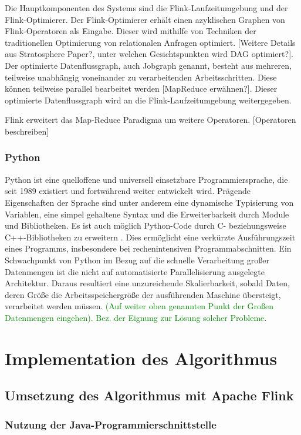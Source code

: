 Die Hauptkomponenten des Systems sind die Flink-Laufzeitumgebung und der Flink-Optimierer. Der Flink-Optimierer erhält einen azyklischen Graphen von Flink-Operatoren als Eingabe. Dieser wird mithilfe von Techniken der traditionellen Optimierung von relationalen Anfragen optimiert. [Weitere Details aus Stratosphere Paper?, unter welchen Gesichtspunkten wird DAG optimiert?]. Der optimierte Datenflussgraph, auch Jobgraph genannt, besteht aus mehreren, teilweise unabhängig voneinander zu verarbeitenden Arbeitsschritten. Diese können teilweise parallel bearbeitet werden [MapReduce erwähnen?]. Dieser optimierte Datenflussgraph wird an die Flink-Laufzeitumgebung weitergegeben. 

Flink erweitert das Map-Reduce Paradigma um weitere Operatoren. [Operatoren beschreiben]
\subsection{Python}
Python ist eine quelloffene und universell einsetzbare Programmiersprache, die seit 1989 existiert und fortwährend weiter entwickelt wird. Prägende Eigenschaften der Sprache sind unter anderem eine dynamische Typisierung von Variablen, eine simpel gehaltene Syntax und die Erweiterbarkeit durch Module und Bibliotheken. Es ist auch möglich Python-Code durch C- beziehungsweise C++-Bibliotheken zu erweitern \cite{Martelli2006}. Dies ermöglicht eine verkürzte Ausführungszeit eines Programms, insbesondere bei rechenintensiven Programmabschnitten. Ein Schwachpunkt von Python im Bezug auf die schnelle Verarbeitung großer Datenmengen ist die nicht auf automatisierte Parallelisierung ausgelegte Architektur. Daraus resultiert eine unzureichende Skalierbarkeit, sobald Daten, deren Größe die Arbeitsspeichergröße der ausführenden Maschine übersteigt, verarbeitet werden müssen. \textcolor{green}{(Auf weiter oben genannten Punkt der Großen Datenmengen eingehen). Bez. der Eignung zur Lösung solcher Probleme}. 

\chapter{Implementation des Algorithmus}
\section{Umsetzung des Algorithmus mit Apache Flink}
\subsection{Nutzung der Java-Programmierschnittstelle}

